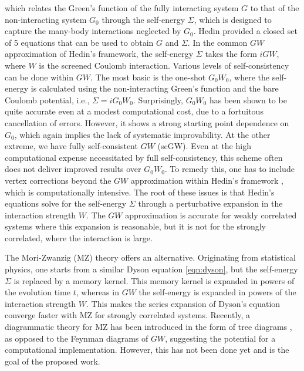 which relates the Green's function of the fully interacting system \( G \) to that of the non-interacting system \( G_0 \) through the self-energy \( \Sigma \), which is designed to capture the many-body interactions neglected by \( G_0 \). Hedin provided a closed set of 5 equations that can be used to obtain \( G \) and \( \Sigma \). In the common \( GW \) approximation of Hedin's framework, the self-energy \( \Sigma \) takes the form \( iGW \), where \( W \) is the screened Coulomb interaction. Various levels of self-consistency can be done within \( GW \). The most basic is the one-shot \( G_0W_0 \), where the self-energy is calculated using the non-interacting Green's function and the bare Coulomb potential, i.e., \( \Sigma = iG_0W_0 \). Surprisingly, \( G_0W_0 \) has been shown to be quite accurate even at a modest computational cost, due to a fortuitous cancellation of errors. However, it shows a strong starting point dependence on \( G_0 \), which again implies the lack of systematic improvability. At the other extreme, we have fully self-consistent \( GW \) (scGW). Even at the high computational expense necessitated by full self-consistency, this scheme often does not deliver improved results over \( G_0W_0 \). To remedy this, one has to include vertex corrections beyond the \( GW \) approximation within Hedin's framework \cite{kutepov_one-electron_2017}, which is computationally intensive. The root of these issues is that Hedin's equations solve for the self-energy \( \Sigma \) through a perturbative expansion in the interaction strength \( W \). The \( GW \) approximation is accurate for weakly correlated systems where this expansion is reasonable, but it is not for the strongly correlated, where the interaction is large.

The Mori-Zwanzig (MZ) theory offers an alternative. Originating from statistical physics, one starts from a similar Dyson equation \ref{eqn:dyson}, but the self-energy \( \Sigma \) is replaced by a memory kernel. This memory kernel is expanded in powers of the evolution time \( t \), whereas in \( GW \) the self-energy is expanded in powers of the interaction strength \( W \). This makes the series expansion of Dyson's equation converge faster with MZ for strongly correlated systems. Recently, a diagrammatic theory for MZ has been introduced in the form of tree diagrams \cite{zhu_combinatorial_2022}, as opposed to the Feynman diagrams of \( GW \), suggesting the potential for a computational implementation. However, this has not been done yet and is the goal of the proposed work. 